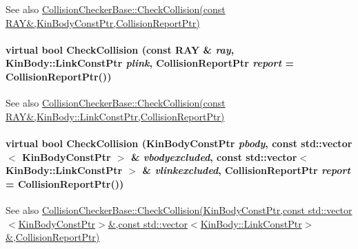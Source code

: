 \label{classOpenRAVE_1_1EnvironmentBase_a91d971fb7be4e4b653fd02ee9bd6528c}
\begin{DoxySeeAlso}{See also}
\hyperlink{classOpenRAVE_1_1CollisionCheckerBase_a91d971fb7be4e4b653fd02ee9bd6528c}{CollisionCheckerBase::CheckCollision(const RAY\&,KinBodyConstPtr,CollisionReportPtr)} 
\end{DoxySeeAlso}
\hypertarget{classOpenRAVE_1_1EnvironmentBase_a0031940d50e5853bed26dd8f37eeb9d6}{
\paragraph[{CheckCollision}]{\setlength{\rightskip}{0pt plus 5cm}virtual bool CheckCollision (const {\bf RAY} \& {\em ray}, \/  KinBody::LinkConstPtr {\em plink}, \/  CollisionReportPtr {\em report} = {\ttfamily CollisionReportPtr()})}\hfill}
\label{classOpenRAVE_1_1EnvironmentBase_a0031940d50e5853bed26dd8f37eeb9d6}
\begin{DoxySeeAlso}{See also}
\hyperlink{classOpenRAVE_1_1CollisionCheckerBase_a0031940d50e5853bed26dd8f37eeb9d6}{CollisionCheckerBase::CheckCollision(const RAY\&,KinBody::LinkConstPtr,CollisionReportPtr)} 
\end{DoxySeeAlso}
\hypertarget{classOpenRAVE_1_1EnvironmentBase_a013763101e3cb1fcad594c030e5472fe}{
\paragraph[{CheckCollision}]{\setlength{\rightskip}{0pt plus 5cm}virtual bool CheckCollision (KinBodyConstPtr {\em pbody}, \/  const std::vector$<$ KinBodyConstPtr $>$ \& {\em vbodyexcluded}, \/  const std::vector$<$ KinBody::LinkConstPtr $>$ \& {\em vlinkexcluded}, \/  CollisionReportPtr {\em report} = {\ttfamily CollisionReportPtr()})}\hfill}
\label{classOpenRAVE_1_1EnvironmentBase_a013763101e3cb1fcad594c030e5472fe}
\begin{DoxySeeAlso}{See also}
\hyperlink{classOpenRAVE_1_1CollisionCheckerBase_a013763101e3cb1fcad594c030e5472fe}{CollisionCheckerBase::CheckCollision(KinBodyConstPtr,const std::vector$<$KinBodyConstPtr$>$\&,const std::vector$<$KinBody::LinkConstPtr$>$\&,CollisionReportPtr)} 
\end{DoxySeeAlso}
